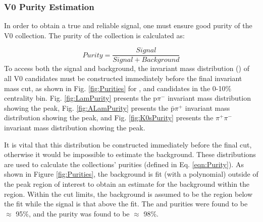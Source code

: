 \documentclass[/home/jesse/Analysis/Dissertation/ThesisBuxton.tex]{subfiles}
\begin{document}
\subsubsection{V0 Purity Estimation}
\label{V0PurEst}

In order to obtain a true and reliable signal, one must ensure good purity of the V0 collection.  The purity of the collection is calculated as:

\begin{equation}
 Purity = \frac{Signal}{Signal + Background}
\label{eqn:Purity}
\end{equation}
To access both the signal and background, the invariant mass distribution (\minv) of all V0 candidates must be constructed immediately before the final invariant mass cut, as shown in Fig. \ref{fig:Purities} for \Lam, \ALam and \Ks candidates in the 0-10\% centrality bin.
Fig. \ref{fig:LamPurity} presents the p$\pi^{-}$ invariant mass distribution showing the \Lam peak, Fig. \ref{fig:ALamPurity} presents the $\bar{\mathrm{p}}\pi^{+}$ invariant mass distribution showing the \ALam peak, and Fig. \ref{fig:K0sPurity} presents the $\pi^{+}\pi^{-}$ invariant mass distribution showing the \Ks peak.

It is vital that this distribution be constructed immediately before the final \minv cut, otherwise it would be impossible to estimate the background.
These distributions are used to calculate the collections' purities (defined in Eq. \ref{eqn:Purity}).
As shown in Figure \ref{fig:Purities}, the background is fit (with a polynomial) outside of the peak region of interest to obtain an estimate for the background within the region.
Within the \minv cut limits, the background is assumed to be the region below the fit while the signal is that above the fit.
The \Lam and \ALam purities were found to be $\approx$ 95\%, and the \Ks purity was found to be $\approx$ 98\%.
\end{document}
